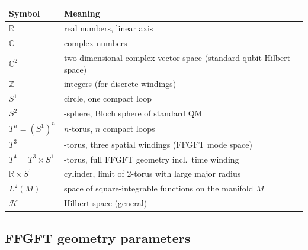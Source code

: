 \begin{center}
\renewcommand{\arraystretch}{1.3}
{\small
\begin{tabular}{>{\raggedright\arraybackslash}p{2.5cm}>{\raggedright\arraybackslash}p{8.5cm}}
\toprule
\textbf{Symbol} & \textbf{Meaning} \\
\midrule
$\mathbb{R}$ & real numbers, linear axis \\
$\mathbb{C}$ & complex numbers \\
$\mathbb{C}^2$ & two-dimensional complex vector space (standard qubit Hilbert space) \\
$\mathbb{Z}$ & integers (for discrete windings) \\
$S^1$ & circle, one compact loop \\
$S^2$ & 2-sphere, Bloch sphere of standard QM \\
$T^n = (S^1)^n$ & $n$-torus, $n$ compact loops \\
$T^3$ & 3-torus, three spatial windings (FFGFT mode space) \\
$T^4 = T^3 \times S^1$ & 4-torus, full FFGFT geometry incl.\ time winding \\
$\mathbb{R} \times S^1$ & cylinder, limit of 2-torus with large major radius \\
$L^2(M)$ & space of square-integrable functions on the manifold $M$ \\
$\mathcal{H}$ & Hilbert space (general) \\
\bottomrule
\end{tabular}
}
\renewcommand{\arraystretch}{1.0}
\end{center}

\subsection*{FFGFT geometry parameters}

